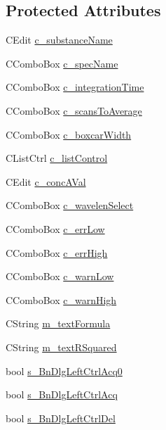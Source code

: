 \subsection*{Protected Attributes}
\begin{DoxyCompactItemize}
\item 
CEdit \hyperlink{classCDlgBarControl_a834b3c6abda75436b00fa39d3e7707cb}{c\_\-substanceName}
\item 
CComboBox \hyperlink{classCDlgBarControl_a8f2720c775c4e1dc8501a204d9093d8a}{c\_\-specName}
\item 
CComboBox \hyperlink{classCDlgBarControl_a095c852adeedb0f6176e14d90e83116d}{c\_\-integrationTime}
\item 
CComboBox \hyperlink{classCDlgBarControl_a692025a7c843c47f34d1f1d9ae0fe1b1}{c\_\-scansToAverage}
\item 
CComboBox \hyperlink{classCDlgBarControl_a8e1a9142314753e6c4391c544c1509ea}{c\_\-boxcarWidth}
\item 
CListCtrl \hyperlink{classCDlgBarControl_a85699a9b7426768ed1499bcb7ba047f2}{c\_\-listControl}
\item 
CEdit \hyperlink{classCDlgBarControl_a992187e820dd20039d1a3f9a0be0a2be}{c\_\-concAVal}
\item 
CComboBox \hyperlink{classCDlgBarControl_a7ebe6de877d465c2ba5bd24bf50fe12a}{c\_\-wavelenSelect}
\item 
CComboBox \hyperlink{classCDlgBarControl_ac978dbf692c08e28165aff70df5086a7}{c\_\-errLow}
\item 
CComboBox \hyperlink{classCDlgBarControl_aad8e57d5814a4007d7e8334c9b744df0}{c\_\-errHigh}
\item 
CComboBox \hyperlink{classCDlgBarControl_a1be634a731e9748ee819f1e70173cf5d}{c\_\-warnLow}
\item 
CComboBox \hyperlink{classCDlgBarControl_a848ab71aafdbcae39b3310d4e5da8a67}{c\_\-warnHigh}
\item 
CString \hyperlink{classCDlgBarControl_a4a7d1846381b404ac8ef587ee2ee8068}{m\_\-textFormula}
\item 
CString \hyperlink{classCDlgBarControl_a7f2dd8513bf46c9edd0e53eb92ca2c41}{m\_\-textRSquared}
\item 
bool \hyperlink{classCDlgBarControl_a9fbc8554844bed83cdf52f10d7c0d3ca}{s\_\-BnDlgLeftCtrlAcq0}
\item 
bool \hyperlink{classCDlgBarControl_a5fa527952f088ef5be48992c16218f7f}{s\_\-BnDlgLeftCtrlAcq}
\item 
bool \hyperlink{classCDlgBarControl_abc4d4418cfbf8651e8b482bf1d91ecd4}{s\_\-BnDlgLeftCtrlDel}

\end{DoxyCompactItemize}
